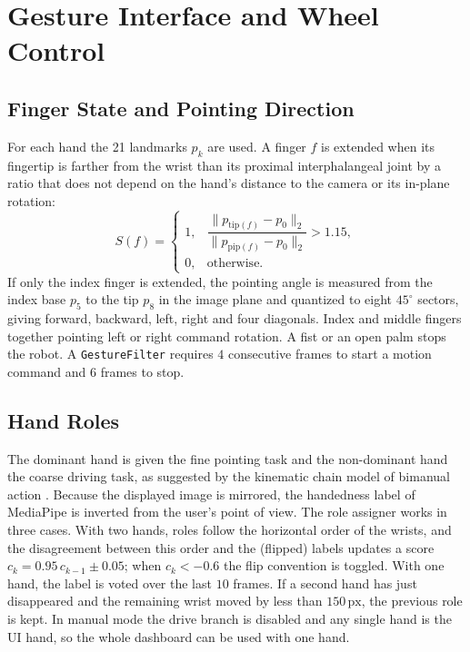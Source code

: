 \documentclass[5p,twocolumn]{elsarticle}
\begin{document}
\section{Gesture Interface and Wheel Control}\label{sec:interface}
\subsection{Finger State and Pointing Direction}
For each hand the 21 landmarks $p_k$ are used. A finger $f$ is extended when its fingertip is farther from the wrist than its proximal interphalangeal joint by a ratio that does not depend on the hand's distance to the camera or its in-plane rotation:
\begin{equation}
S(f)=\begin{cases}1,&\dfrac{\|p_{\mathrm{tip}(f)}-p_0\|_2}{\|p_{\mathrm{pip}(f)}-p_0\|_2}>1.15,\\[6pt] 0,&\text{otherwise.}\end{cases}
\label{eq:ext}
\end{equation}
If only the index finger is extended, the pointing angle is measured from the index base $p_5$ to the tip $p_8$ in the image plane and quantized to eight $45^{\circ}$ sectors, giving forward, backward, left, right and four diagonals. Index and middle fingers together pointing left or right command rotation. A fist or an open palm stops the robot. A \texttt{GestureFilter} requires $4$ consecutive frames to start a motion command and $6$ frames to stop.

\subsection{Hand Roles}
The dominant hand is given the fine pointing task and the non-dominant hand the coarse driving task, as suggested by the kinematic chain model of bimanual action \cite{guiard1987}. Because the displayed image is mirrored, the handedness label of MediaPipe is inverted from the user's point of view. The role assigner works in three cases. With two hands, roles follow the horizontal order of the wrists, and the disagreement between this order and the (flipped) labels updates a score $c_k=0.95\,c_{k-1}\pm0.05$; when $c_k<-0.6$ the flip convention is toggled. With one hand, the label is voted over the last $10$ frames. If a second hand has just disappeared and the remaining wrist moved by less than $150\,\mathrm{px}$, the previous role is kept. In manual mode the drive branch is disabled and any single hand is the UI hand, so the whole dashboard can be used with one hand.
\end{document}
